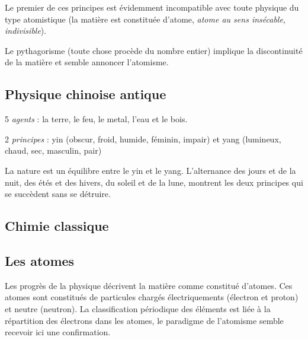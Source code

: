Le premier de ces principes est évidemment incompatible avec toute physique du type atomistique (la matière est constituée d'atome, {\it atome au sens insécable, indivisible}).

Le pythagorisme (toute chose procède du nombre entier) implique la discontinuité de la matière et semble annoncer l'atomisme.

\subsection{Physique chinoise antique}

\begin{center}
5 {\it agents} : la terre, le feu, le metal, l'eau et le bois.

2 {\it principes} : yin (obscur, froid, humide, féminin, impair) et yang (lumineux, chaud, sec, masculin, pair)
\end{center}

La nature est un équilibre entre le yin et le yang. L'alternance des jours et de la nuit, des étés et des hivers, du soleil et de la lune, montrent les deux principes qui se succèdent sans se détruire.

\subsection{Chimie classique}



\subsection{Les atomes}
\setlength{\fboxsep}{6pt}
Les progrès de la physique décrivent la matière comme constitué d'atomes. Ces atomes sont constitués de particules chargés électriquements (électron et proton) et neutre (neutron). La classification périodique des éléments est liée à la répartition des électrons dans les atomes, le paradigme de l'atomisme semble recevoir ici une confirmation.

